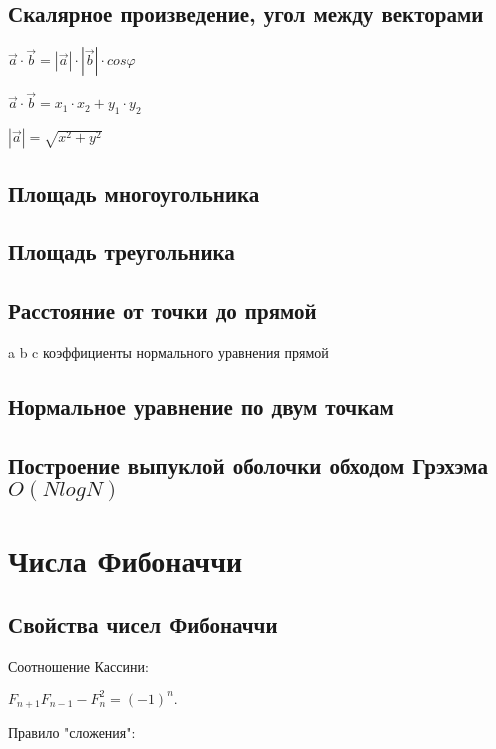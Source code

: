 \documentclass[a4paper]{article}
\begin{document}
\begin{multicols*}{2}
		 \subsection{Скалярное произведение, угол между векторами}
		 
		 $\vec a \cdot \vec b = |\vec a| \cdot |\vec b| \cdot cos \varphi$
		 
		 $\vec a \cdot \vec b = x_1 \cdot x_2 + y_1 \cdot y_2$
		 
		 $|\vec a| = \sqrt{x^2 + y^2}$
		 
		 \subsection{Площадь многоугольника}
		 		 
		 \subsection{Площадь треугольника}
		 
		 \subsection{Расстояние от точки до прямой}
		 a b c коэффициенты нормального уравнения прямой
		 
		 \subsection{Нормальное уравнение по двум точкам}
		 	
		 \subsection{Построение выпуклой оболочки обходом Грэхэма $O (N log N)$}
		 
		 
		 \section{Числа Фибоначчи}		 
		 \subsection{Свойства чисел Фибоначчи}
		 
		 Соотношение Кассини:
		 
		 $F_{n+1} F_{n-1} - F_n^2 = (-1)^n.$
		 
		 Правило "сложения":
		 

\end{multicols*}
\end{document}

